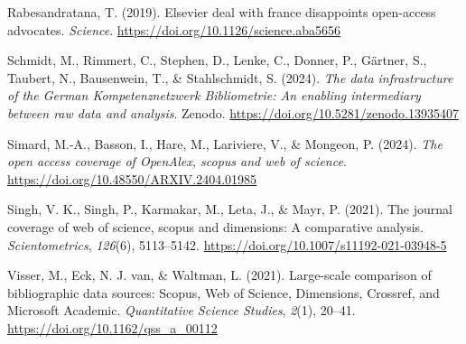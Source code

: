 \documentclass[a4paper,man,floatsintext,longtable,noextraspace,10pt]{apa6}
\newlength{\cslhangindent}
\newenvironment{CSLReferences}[2] %
{\begin{list}{}{%
  \setlength{\itemindent}{0pt}
  \setlength{\leftmargin}{0pt}
  \setlength{\parsep}{0pt}
  \ifodd #1
  \setlength{\leftmargin}{\cslhangindent}
  \setlength{\itemindent}{-1\cslhangindent}
  \fi
  \setlength{\itemsep}{#2\baselineskip}}}
{\end{list}}
\begin{document}
\begin{CSLReferences}{1}{0}
Rabesandratana, T. (2019). Elsevier deal with france disappoints
open-access advocates. \emph{Science}.
\url{https://doi.org/10.1126/science.aba5656}

Schmidt, M., Rimmert, C., Stephen, D., Lenke, C., Donner, P., Gärtner,
S., Taubert, N., Bausenwein, T., \& Stahlschmidt, S. (2024). \emph{The
data infrastructure of the {German Kompetenznetzwerk Bibliometrie}: An
enabling intermediary between raw data and analysis}. Zenodo.
\url{https://doi.org/10.5281/zenodo.13935407}

Simard, M.-A., Basson, I., Hare, M., Lariviere, V., \& Mongeon, P.
(2024). \emph{The open access coverage of OpenAlex, scopus and web of
science}. \url{https://doi.org/10.48550/ARXIV.2404.01985}

Singh, V. K., Singh, P., Karmakar, M., Leta, J., \& Mayr, P. (2021). The
journal coverage of web of science, scopus and dimensions: A comparative
analysis. \emph{Scientometrics}, \emph{126}(6), 5113--5142.
\url{https://doi.org/10.1007/s11192-021-03948-5}

Visser, M., Eck, N. J. van, \& Waltman, L. (2021). Large-scale
comparison of bibliographic data sources: {Scopus, Web of Science,
Dimensions, Crossref, and Microsoft Academic}. \emph{Quantitative
Science Studies}, \emph{2}(1), 20--41.
\url{https://doi.org/10.1162/qss_a_00112}

\end{CSLReferences}
\end{document}
